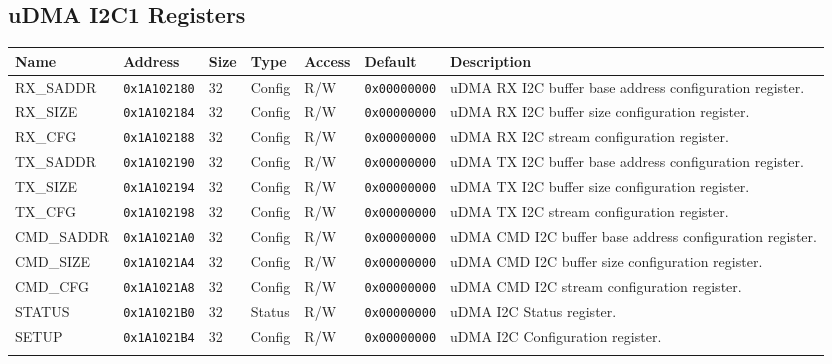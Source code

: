 
\subsection{uDMA I2C1 Registers}
{\small
\begin{tabularx}{\textwidth}{|l|l|l|l|l|l|X|}
  \hline
  \textbf{Name} & \textbf{Address}  & \textbf{Size} & \textbf{Type} & \textbf{Access} & \textbf{Default} & \textbf{Description} \\
  \hline
  RX\_SADDR & \texttt{0x1A102180} & 32 & Config & R/W & \texttt{0x00000000} & uDMA RX I2C buffer base address configuration register.\\
  \hline
  RX\_SIZE & \texttt{0x1A102184} & 32 & Config & R/W & \texttt{0x00000000} & uDMA RX I2C buffer size configuration register.\\
  \hline
  RX\_CFG & \texttt{0x1A102188} & 32 & Config & R/W & \texttt{0x00000000} & uDMA RX I2C stream configuration register.\\
  \hline
  TX\_SADDR & \texttt{0x1A102190} & 32 & Config & R/W & \texttt{0x00000000} & uDMA TX I2C buffer base address configuration register.\\
  \hline
  TX\_SIZE & \texttt{0x1A102194} & 32 & Config & R/W & \texttt{0x00000000} & uDMA TX I2C buffer size configuration register.\\
  \hline
  TX\_CFG & \texttt{0x1A102198} & 32 & Config & R/W & \texttt{0x00000000} & uDMA TX I2C stream configuration register.\\
  \hline
  CMD\_SADDR & \texttt{0x1A1021A0} & 32 & Config & R/W & \texttt{0x00000000} & uDMA CMD I2C buffer base address configuration register.\\
  \hline
  CMD\_SIZE & \texttt{0x1A1021A4} & 32 & Config & R/W & \texttt{0x00000000} & uDMA CMD I2C buffer size configuration register.\\
  \hline
  CMD\_CFG & \texttt{0x1A1021A8} & 32 & Config & R/W & \texttt{0x00000000} & uDMA CMD I2C stream configuration register.\\
  \hline
  STATUS & \texttt{0x1A1021B0} & 32 & Status & R/W & \texttt{0x00000000} & uDMA I2C Status register.\\
  \hline
  SETUP & \texttt{0x1A1021B4} & 32 & Config & R/W & \texttt{0x00000000} & uDMA I2C Configuration register.\\
  \hline
  \caption{uDMA I2C1}
\end{tabularx}
}




